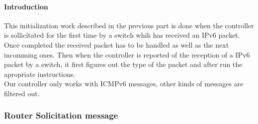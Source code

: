 \documentclass{article}
\begin{document}
\paragraph{Introduction}
This initialization work described in the previous part is done when
the controller is sollicitated for the first time by a switch whih has
received an IPv6 packet. Once completed the received packet has to be
handled as well as the next incomming ones. Then when the controller
is reported of the reception of a IPv6 packet by a switch, it first
figures out the type of the packet and after run the apropriate
instructions.\\
Our controller only works with ICMPv6 messages, other kinds of
messages are filtered out.

\subsubsection{Router Solicitation message}
\end{document}
